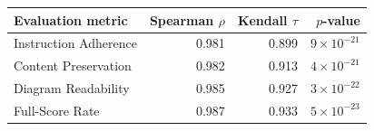 \begin{tabular}{lrrr}
\hline
Evaluation metric & Spearman $\rho$ & Kendall $\tau$ & $p$-value \\
\hline
Instruction Adherence & 0.981 & 0.899 & $9 \times 10^{-21}$ \\
Content Preservation & 0.982 & 0.913 & $4 \times 10^{-21}$ \\
Diagram Readability & 0.985 & 0.927 & $3 \times 10^{-22}$ \\
Full-Score Rate & 0.987 & 0.933 & $5 \times 10^{-23}$ \\
\hline
\end{tabular}
